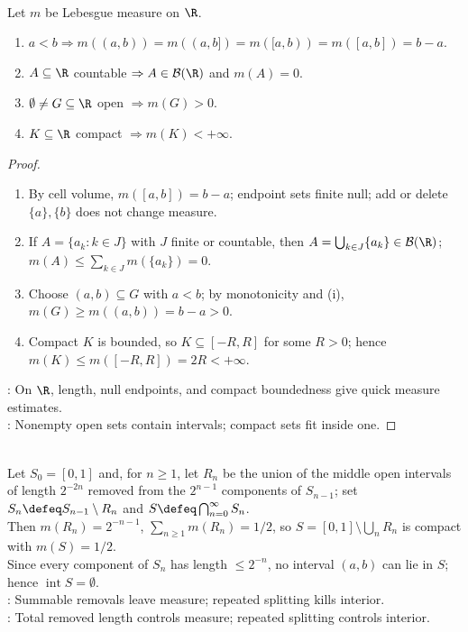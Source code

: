\begin{corollary} \label{cor:real-line-lebesgue-measure-checks} \\
Let $m$ be Lebesgue measure on $\R$.
\begin{enumerate}[label=(\roman*)]
\setlength{\itemsep}{0pt}
\item $a<b\Rightarrow m((a,b))=m((a,b])=m([a,b))=m([a,b])=b-a$.
\item $A\subseteq\R$ countable $\Rightarrow A\in\mathcal{B}(\R)$ and $m(A)=0$.
\item $\emptyset\neq G\subseteq\R$ open $\Rightarrow m(G)>0$.
\item $K\subseteq\R$ compact $\Rightarrow m(K)<+\infty$.
\end{enumerate}
\begin{proof}
\begin{enumerate}[label=(\roman*)]
\setlength{\itemsep}{0pt}
\item By cell volume, $m([a,b])=b-a$; endpoint sets finite null; add or delete $\{a\},\{b\}$ does not change measure.
\item If $A=\{a_k:k\in J\}$ with $J$ finite or countable, then $A=\bigcup_{k\in J}\{a_k\}\in\mathcal{B}(\R)$; $m(A)\leq\sum_{k\in J}m(\{a_k\})=0$.
\item Choose $(a,b)\subseteq G$ with $a<b$; by monotonicity and (i), $m(G)\geq m((a,b))=b-a>0$.
\item Compact $K$ is bounded, so $K\subseteq[-R,R]$ for some $R>0$; hence $m(K)\leq m([-R,R])=2R<+\infty$.
\end{enumerate}
: On $\R$, length, null endpoints, and compact boundedness give quick measure estimates.\\
: Nonempty open sets contain intervals; compact sets fit inside one.
\end{proof}
\end{corollary}

\begin{example} \label{ex:fat-cantor-set-positive-measure-empty-interior} \\
Let $S_0=[0,1]$ and, for $n\geq1$, let $R_n$ be the union of the middle open intervals of length $2^{-2n}$ removed from the $2^{n-1}$ components of $S_{n-1}$; set $S_n\defeq S_{n-1}\setminus R_n$ and $S\defeq\bigcap_{n=0}^{\infty}S_n$.\\
Then $m(R_n)=2^{-n-1}$, $\sum_{n\geq1}m(R_n)=1/2$, so $S=[0,1]\setminus\bigcup_nR_n$ is compact with $m(S)=1/2$.\\
Since every component of $S_n$ has length $\leq2^{-n}$, no interval $(a,b)$ can lie in $S$; hence $\operatorname{int}S=\emptyset$.\\
: Summable removals leave measure; repeated splitting kills interior.\\
: Total removed length controls measure; repeated splitting controls interior.
\end{example}
